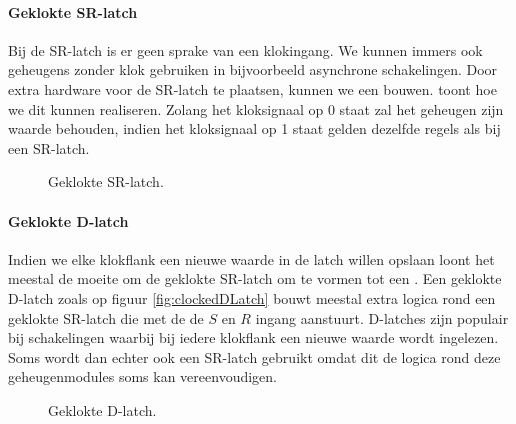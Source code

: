 \paragraph{Geklokte SR-latch}
Bij de SR-latch is er geen sprake van een klokingang. We kunnen immers ook geheugens zonder klok gebruiken in bijvoorbeeld asynchrone schakelingen. Door extra hardware voor de SR-latch te plaatsen, kunnen we een  bouwen.  toont hoe we dit kunnen realiseren. Zolang het kloksignaal op 0 staat zal het geheugen zijn waarde behouden, indien het kloksignaal op 1 staat gelden dezelfde regels als bij een SR-latch.
\begin{figure}[hbt]
\centering
{}
\caption{Geklokte SR-latch.}
\end{figure}
\paragraph{Geklokte D-latch}
Indien we elke klokflank een nieuwe waarde in de latch willen opslaan loont het meestal de moeite om de geklokte SR-latch om te vormen tot een . Een geklokte D-latch zoals op figuur \ref{fig:clockedDLatch} bouwt meestal extra logica rond een geklokte SR-latch die met de  de $S$ en $R$ ingang aanstuurt. D-latches zijn populair bij schakelingen waarbij bij iedere klokflank een nieuwe waarde wordt ingelezen. Soms wordt dan echter ook een SR-latch gebruikt omdat dit de logica rond deze geheugenmodules soms kan vereenvoudigen.
\begin{figure}[hbt]
\centering
{}
\caption{Geklokte D-latch.}
\end{figure}
